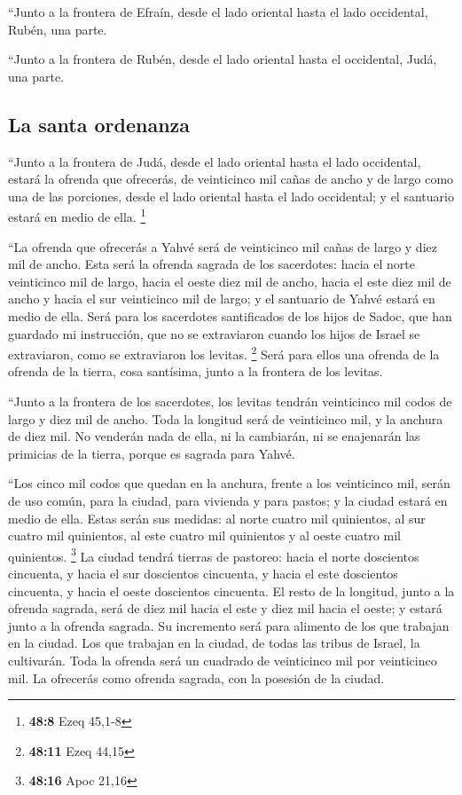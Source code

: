 \begin{paracol}{2}
 ``Junto a la frontera de Efraín, desde el lado oriental
hasta el lado occidental, Rubén, una parte.

 ``Junto a la frontera de Rubén, desde el lado oriental
hasta el occidental, Judá, una parte.

\hypertarget{la-santa-ordenanza}{%
\subsection{La santa ordenanza}\label{la-santa-ordenanza}}

 ``Junto a la frontera de Judá, desde el lado oriental
hasta el lado occidental, estará la ofrenda que ofrecerás, de
veinticinco mil cañas de ancho y de largo como una de las porciones,
desde el lado oriental hasta el lado occidental; y el santuario estará
en medio de ella. \footnote{\textbf{48:8} Ezeq 45,1-8}

 ``La ofrenda que ofrecerás a Yahvé será de veinticinco
mil cañas de largo y diez mil de ancho.  Esta será la
ofrenda sagrada de los sacerdotes: hacia el norte veinticinco mil de
largo, hacia el oeste diez mil de ancho, hacia el este diez mil de ancho
y hacia el sur veinticinco mil de largo; y el santuario de Yahvé estará
en medio de ella.  Será para los sacerdotes santificados
de los hijos de Sadoc, que han guardado mi instrucción, que no se
extraviaron cuando los hijos de Israel se extraviaron, como se
extraviaron los levitas. \footnote{\textbf{48:11} Ezeq 44,15}
 Será para ellos una ofrenda de la ofrenda de la tierra,
cosa santísima, junto a la frontera de los levitas.

 ``Junto a la frontera de los sacerdotes, los levitas
tendrán veinticinco mil codos de largo y diez mil de ancho. Toda la
longitud será de veinticinco mil, y la anchura de diez mil.
 No venderán nada de ella, ni la cambiarán, ni se
enajenarán las primicias de la tierra, porque es sagrada para Yahvé.

 ``Los cinco mil codos que quedan en la anchura, frente a
los veinticinco mil, serán de uso común, para la ciudad, para vivienda y
para pastos; y la ciudad estará en medio de ella.  Estas
serán sus medidas: al norte cuatro mil quinientos, al sur cuatro mil
quinientos, al este cuatro mil quinientos y al oeste cuatro mil
quinientos. \footnote{\textbf{48:16} Apoc 21,16}  La
ciudad tendrá tierras de pastoreo: hacia el norte doscientos cincuenta,
y hacia el sur doscientos cincuenta, y hacia el este doscientos
cincuenta, y hacia el oeste doscientos cincuenta.  El
resto de la longitud, junto a la ofrenda sagrada, será de diez mil hacia
el este y diez mil hacia el oeste; y estará junto a la ofrenda sagrada.
Su incremento será para alimento de los que trabajan en la ciudad.
 Los que trabajan en la ciudad, de todas las tribus de
Israel, la cultivarán.  Toda la ofrenda será un cuadrado
de veinticinco mil por veinticinco mil. La ofrecerás como ofrenda
sagrada, con la posesión de la ciudad.


\end{paracol}
